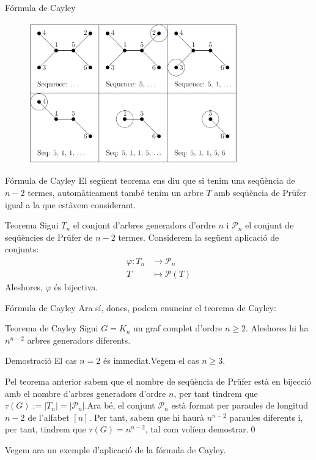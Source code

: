 \documentclass{beamer}
\begin{document}
\begin{frame}{Fórmula de Cayley}
    \begin{figure}[ht]
   \centering
   \includegraphics[width=9cm]{imatges/prufer1.jpg}
\end{figure}
\end{frame}
\begin{frame}{Fórmula de Cayley}
    El següent teorema ens diu que si tenim una seqüència de $n-2$ termes, automàticament també tenim un arbre $T$ amb seqüència de Prüfer igual a la que estàvem considerant.\pause
\begin{alertblock}{Teorema}
Sigui $T_n$ el conjunt d'arbres generadors d'ordre $n$ i $\mathcal{P}_n$ el conjunt de seqüències de Prüfer de $n-2$ termes. Considerem la següent aplicació de conjunts:
\begin{align*}
    \varphi:T_n&\rightarrow \mathcal{P}_n\\
    T&\mapsto \mathcal{P}(T)
\end{align*}\pause
Aleshores, $\varphi$ és bijectiva.
\end{alertblock}
\end{frame}
\begin{frame}{Fórmula de Cayley}
    Ara sí, doncs, podem enunciar el teorema de Cayley:\pause
\begin{alertblock}{Teorema de Cayley}
Sigui $G=K_n$ un graf complet d'ordre $n\geq 2$. Aleshores hi ha $n^{n-2}$ arbres generadors diferents.
\end{alertblock}\pause
\begin{block}{Demostració}
El cas $n=2$ és immediat.\pause\space Vegem el cas $n\geq3$.\par
Pel teorema anterior sabem que el nombre de seqüència de Prüfer està en bijecció amb el nombre d'arbres generadors d'ordre $n$, per tant tindrem que $\tau(G):=|T_n|=|\mathcal{P}_n|$.\pause\space Ara bé, el conjunt $\mathcal{P}_n$ està format per paraules de longitud $n-2$ de l'alfabet $[n]$. Per tant, sabem que hi haurà $n^{n-2}$ paraules diferents i, per tant, tindrem que $\tau(G)=n^{n-2}$, tal com volíem demostrar.\qed
\end{block}\pause
Vegem ara un exemple d'aplicació de la fórmula de Cayley.
\end{frame}
\end{document}
